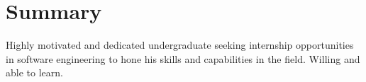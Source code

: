 \section{\textcolor{section_2}{Summary}}
\vspace{-\parskip}
Highly motivated and dedicated undergraduate seeking internship opportunities in software engineering to hone his skills and capabilities in the field. Willing and able to learn.

